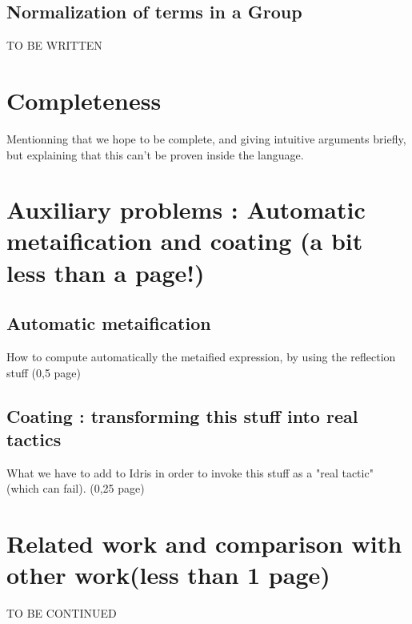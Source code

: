 \documentclass{sigplanconf}
\begin{document}
	\subsection {Normalization of terms in a Group}

TO BE WRITTEN

\section{Completeness}

Mentionning that we hope to be complete, and giving intuitive arguments briefly, but explaining that this can't be proven inside the language.



\section {Auxiliary problems : Automatic metaification and coating (a bit less than a page!)}

	\subsection {Automatic metaification}

How to compute automatically the metaified expression, by using the reflection stuff (0,5 page)

	\subsection {Coating : transforming this stuff into real tactics}

What we have to add to Idris in order to invoke this stuff as a "real tactic" (which can fail). (0,25 page)


\section {Related work and comparison with other work(less than 1 page)}

TO BE CONTINUED
\end{document}
